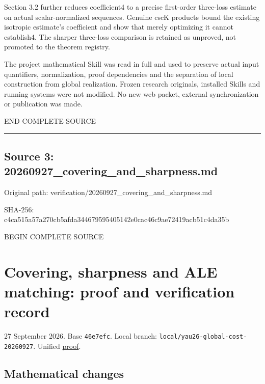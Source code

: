 \documentclass[
  10pt,
]{article}
\begin{document}
Section 3.2 further reduces coefficient4 to a precise first-order
three-loss estimate on actual scalar-normalized sequences. Genuine cscK
products bound the existing isotropic estimate's coefficient and show
that merely optimizing it cannot establish4. The sharper three-loss
comparison is retained as unproved, not promoted to the theorem
registry.

The project mathematical Skill was read in full and used to preserve
actual input quantifiers, normalization, proof dependencies and the
separation of local construction from global realization. Frozen
research originals, installed Skills and running systems were not
modified. No new web packet, external synchronization or publication was
made.

END COMPLETE SOURCE

\begin{center}\rule{0.5\linewidth}{0.5pt}\end{center}

\hypertarget{source-3-20260927_covering_and_sharpness.md}{%
\subsection{Source 3:
20260927\_covering\_and\_sharpness.md}\label{source-3-20260927_covering_and_sharpness.md}}

Original path: verification/20260927\_covering\_and\_sharpness.md

SHA-256:
c4ca515a57a270cb5afda344679595405142e0cac46c9ae72419acb51c4da35b

BEGIN COMPLETE SOURCE

\hypertarget{covering-sharpness-and-ale-matching-proof-and-verification-record}{%
\section{Covering, sharpness and ALE matching: proof and verification
record}\label{covering-sharpness-and-ale-matching-proof-and-verification-record}}

27 September 2026. Base \texttt{46e7efc}. Local branch:
\texttt{local/yau26-global-cost-20260927}. Unified
\href{../continuation/20260927_covering_geometry_and_sharp_subfamilies.md}{proof}.

\hypertarget{mathematical-changes}{%
\subsection{Mathematical changes}\label{mathematical-changes}}
\end{document}
